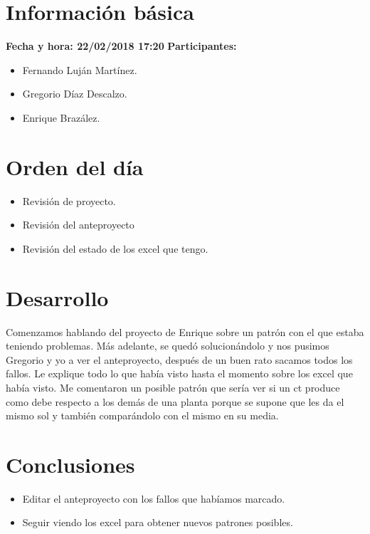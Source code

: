 \documentclass[a4paper]{article}
\begin{document}
\section{Información básica}
\textbf{Fecha y hora: 22/02/2018 17:20}
\newline
\textbf{Participantes:}
\begin{itemize}
	\item Fernando Luján Martínez.
    \item Gregorio Díaz Descalzo.
    \item Enrique Brazález.
\end{itemize}
\section{Orden del día}
\begin{itemize}
\item Revisión de proyecto.
\item Revisión del anteproyecto
\item Revisión del estado de los excel que tengo.
\end{itemize}
\section{Desarrollo}
Comenzamos hablando del proyecto de Enrique sobre un patrón con el que estaba teniendo problemas. Más adelante, se quedó solucionándolo y nos pusimos Gregorio y yo a ver el anteproyecto, después de un buen rato sacamos todos los fallos. Le explique todo lo que había visto hasta el momento sobre los excel que había visto. Me comentaron un posible patrón que sería ver si un ct produce como debe respecto a los demás de una planta porque se supone que les da el mismo sol y también comparándolo con el mismo en su media.
\section{Conclusiones}
\begin{itemize}
\item Editar el anteproyecto con los fallos que habíamos marcado.
\item Seguir viendo los excel para obtener nuevos patrones posibles.
\end{itemize}
\end{document}
